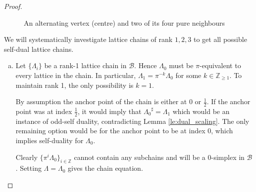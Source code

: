 \documentclass{eptcs}
\theoremstyle{remark}
\theoremstyle{definition}
\newcommand{\dual}[1]{{#1}^{\sharp}}
\begin{document}
\begin{proof}
\begin{figure}
    \centering
    \label{fig:alternatingvert}
    \caption{An alternating vertex (centre) and two of its four pure neighbours}
\end{figure}
We will systematically investigate lattice chains of rank $1,2,3$ to get all possible self-dual lattice chains.
    \begin{enumerate}[(a)]
    \item 
    { Let $\{\Lambda_i\}$ be a rank-1 lattice chain in $\mathcal{B}$. Hence $\Lambda_0$ must be $\pi$-equivalent to every lattice in the chain. In particular, $\Lambda_1 = \pi^{-k} \Lambda_0$ for some $k \in \mathbb{Z}_{\geq 1}$. To maintain rank 1, the only possibility is $k=1$.
    
    By assumption the anchor point of the chain is either at $0$ or $\tfrac{1}{2}$. If the anchor point was at index $\frac{1}{2}$, it would imply that $\dual{\Lambda_0} = \Lambda_1 $ which would be an instance of odd-self duality, contradicting Lemma \ref{le:dual_scaling}. The only remaining option would be for the anchor point to be at index $0$, which implies self-duality for $\Lambda_0$. 
    
    Clearly $\{ \pi^i\Lambda_0\}_{i \in \mathbb{Z}}$ cannot contain any subchains and will be a $0$-simplex in $\mathcal{B}$.
Setting $\Lambda= \Lambda_0$ gives the chain equation.
       

}
\end{enumerate}
\end{proof}
\end{document}
